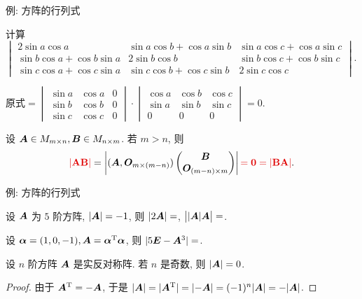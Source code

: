 \begin{frame}{例: 方阵的行列式}
	\onslide<+->
	\begin{example}
		计算
		$\begin{vmatrix}
			2\sin a\cos a&\sin a\cos b+\cos a\sin b&\sin a\cos c+\cos a\sin c\\
			\sin b\cos a+\cos b\sin a&2\sin b\cos b&\sin b\cos c+\cos b\sin c\\
			\sin c\cos a+\cos c\sin a&\sin c\cos b+\cos c\sin b&2\sin c\cos c
		\end{vmatrix}$.
	\end{example}
	\onslide<+->
	\begin{solution}
		原式$=\begin{vmatrix}
			\sin a&\cos a&0\\
			\sin b&\cos b&0\\
			\sin c&\cos c&0
		\end{vmatrix}\cdot\begin{vmatrix}
			\cos a&\cos b&\cos c\\
			\sin a&\sin b&\sin c\\
			0&0&0
		\end{vmatrix}=0$.
	\end{solution}
	\onslide<+->
	设 ${\boldsymbol{A}}\in M_{m\times n},{\boldsymbol{B}}\in M_{n\times m}$.
	\onslide<+->
	若 $m>n$, 则
	\[\alert{|\bfA\bfB|}=\left|
		(\bfA,\bfO_{m\times(m-n)})\begin{pmatrix}
		\bfB\\\bfO_{(m-n)\times m}
	\end{pmatrix}\right|\alert{=0=|\bfB\bfA|}.\]
\end{frame}


\begin{frame}{例: 方阵的行列式}
	\onslide<+->
	\begin{exercise}
		设 ${\boldsymbol{A}}$ 为 $5$ 阶方阵, $|{\boldsymbol{A}}|=-1$, 则
		$|2{\boldsymbol{A}}|=$,
		$\bigl||{\boldsymbol{A}}|{\boldsymbol{A}}\bigr|=$.
	\end{exercise}
	\onslide<+->
	\begin{exercise}
		设 ${\boldsymbol{\alpha}}=(1,0,-1),{\boldsymbol{A}}={\boldsymbol{\alpha}}^{\mathrm{T}}{\boldsymbol{\alpha}}$, 则
		$|5{\boldsymbol{E}}-{\boldsymbol{A}}^3|=$\fillblank{\visible<+->{$-75$}}.
	\end{exercise}
	\onslide<+->
	\begin{example}
		设 $n$ 阶方阵 ${\boldsymbol{A}}$ 是实反对称阵.
		若 $n$ 是奇数, 则 $|\bfA|=0$.
	\end{example}
	\onslide<+->
	\begin{proof}
		由于 ${\boldsymbol{A}}^{\mathrm{T}}=-{\boldsymbol{A}}$, 于是 $|{\boldsymbol{A}}|=|{\boldsymbol{A}}^{\mathrm{T}}|=|{-{\boldsymbol{A}}}|=(-1)^n|{\boldsymbol{A}}|=-|{\boldsymbol{A}}|$.
		\onslide<+->{故 $|\bfA|=0$.\qedhere}
	\end{proof}
\end{frame}


